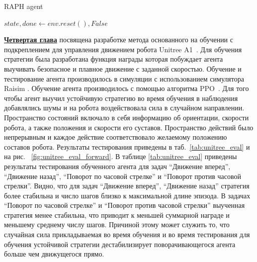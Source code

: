 \begin{algorithm}[ht]
\caption{RAPH agent}\label{alg:raph}
$state, done \gets env.reset(), False$\;

\end{algorithm}

\underline{\textbf{Четвертая глава}} посвящена разработке метода основанного на обучении с подкреплением для управления движением
робота Unitree A1~\cite{unitree}. Для обучения стратегии была разработана функция награды
которая побуждает агента выучивать безопасное и плавное движение с заданной скоростью. Обучение и тестирование агента производилось в симуляции с использованием симулятора Raisim \cite{raisim}. Обучение агента производилось с помощью алгоритма PPO~\cite{Schulman2017ProximalPO}. Для того чтобы агент выучил устойчивую стратегию во время
обучения в наблюдения добавлялись шумы и на робота воздействовала сила в случайном направлении. Пространство состояний включало в себя информацию об ориентации, скорости робота, а также положения и скорости его суставов. Пространство действий было непрерывным и каждое действие соответствовало желаемому положению составов робота. Результаты тестирования приведены в таб.~\ref{tab:unitree_eval} и на рис.~ \ref{fig:unitree_eval_forward}. В таблице \ref{tab:unitree_eval} приведены результаты тестирования обученного агента для задач ``Движение вперед'', ``Движение назад'', ``Поворот по часовой стрелке'' и ``Поворот против часовой стрелки''. Видно, что для задач ``Движение вперед'', ``Движение назад'' стратегия более стабильна и число шагов близко к максимальной длине эпизода. В задачах ``Поворот по часовой стрелке'' и ``Поворот против часовой стрелки'' выученная стратегия менее стабильна, что приводит к меньшей суммарной награде и меньшему среднему числу шагов. Причиной этому может служить то, что случайная сила прикладываемая во время обучения и во время тестирования для обучения устойчивой стратегии дестабилизирует поворачивающегося агента больше чем движущегося прямо.

